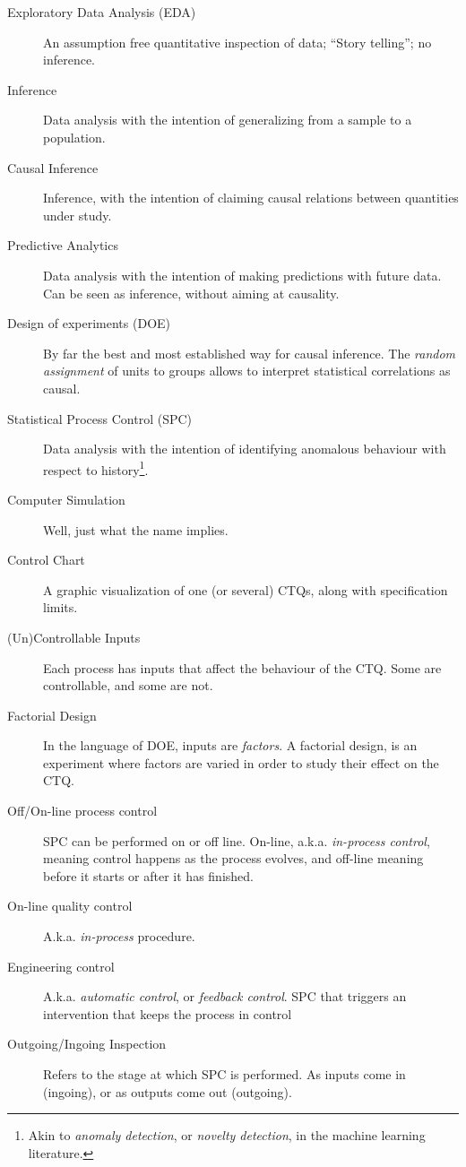 \documentclass[12pt,a4paper]{report}
\begin{document}
\begin{description}
\item [Exploratory Data Analysis (EDA)] An assumption free quantitative inspection of data; ``Story telling''; no inference.
\item [Inference] Data analysis with the intention of generalizing from a sample to a population.
\item [Causal Inference] Inference, with the intention of claiming causal relations between quantities under study.
\item [Predictive Analytics] Data analysis with the intention of making predictions with future data. Can be seen as inference, without aiming at causality.
\item [Design of experiments (DOE)]  By far the best and most established way for causal inference. The \emph{random assignment} of units to groups allows to interpret statistical correlations as causal.
\item [Statistical Process Control (SPC)] Data analysis with the intention of identifying anomalous behaviour with respect to history\footnote{Akin to \emph{anomaly detection}, or \emph{novelty detection}, in the machine learning literature.}. 
\item [Computer Simulation] Well, just what the name implies. 
\item [Control Chart] A graphic visualization of one (or several) CTQs, along with specification limits. 
\item [(Un)Controllable Inputs] Each process has inputs that affect the behaviour of the CTQ. Some are controllable, and some are not.
\item [Factorial Design] In the language of DOE, inputs are \emph{factors}. A factorial design, is an experiment where factors are varied in order to study their effect on the CTQ.
\item [Off/On-line process control] SPC can be performed on or off line. 
On-line, a.k.a. \emph{in-process control},  meaning control happens as the process evolves, and off-line meaning before it starts or after it has finished.
\item [On-line quality control] A.k.a. \emph{in-process} procedure. 
\item [Engineering control] A.k.a. \emph{automatic control}, or \emph{feedback control}. SPC that triggers an intervention that keeps the process in control
\item [Outgoing/Ingoing Inspection] Refers to the stage at which SPC is performed. As inputs come in (ingoing), or as outputs come out (outgoing). 
\end{description}
\end{document}
